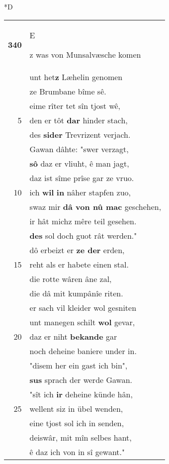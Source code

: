 \documentclass[8pt,a4paper,notitlepage]{article}
\begin{document}
\begin{table}[ht]
\begin{minipage}[t]{0.5\linewidth}
\small
\begin{center}*D
\end{center}
\begin{tabular}{rl}
\textbf{340} & \begin{large}E\end{large}z was von Munsalvæsche komen\\ 
 & unt het\textbf{z} Læhelin genomen\\ 
 & ze Brumbane bîme sê.\\ 
 & eime rîter tet sîn tjost wê,\\ 
5 & den er tôt \textbf{dar} hinder stach,\\ 
 & des \textbf{sider} Trevrizent verjach.\\ 
 & Gawan dâhte: "swer verzagt,\\ 
 & \textbf{sô} daz er vliuht, ê man jagt,\\ 
 & daz ist sîme prîse gar ze vruo.\\ 
10 & ich \textbf{wil} \textbf{in} nâher stapfen zuo,\\ 
 & swaz mir \textbf{dâ von nû mac} geschehen,\\ 
 & ir hât michz mêre teil gesehen.\\ 
 & \textbf{des} sol doch guot rât werden."\\ 
 & dô erbeizt er \textbf{ze der} erden,\\ 
15 & reht als er habete einen stal.\\ 
 & die rotte wâren âne zal,\\ 
 & die dâ mit kumpânîe riten.\\ 
 & er sach vil kleider wol gesniten\\ 
 & unt manegen schilt \textbf{wol} gevar,\\ 
20 & daz er niht \textbf{bekande} gar\\ 
 & noch deheine baniere under in.\\ 
 & "disem her ein gast ich bin",\\ 
 & \textbf{sus} sprach der werde Gawan.\\ 
 & "sît ich \textbf{ir} deheine künde hân,\\ 
25 & wellent siz in übel wenden,\\ 
 & eine tjost sol ich in senden,\\ 
 & deiswâr, mit mîn selbes hant,\\ 
 & ê daz ich von in sî gewant."\\ 

\end{tabular}
\end{minipage}
\end{table}
\end{document}
